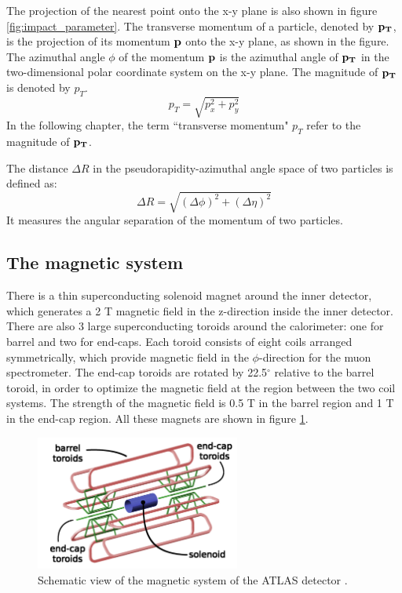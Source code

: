 The projection of the nearest point onto the x-y plane is also shown in figure \ref{fig:impact_parameter}.
The transverse momentum of a particle, denoted by $\bf{p}_T$, is the projection of its momentum $\bf{p}$ onto the x-y plane, as shown in the figure.
The azimuthal angle $\phi$ of the momentum $\bf{p}$ is the azimuthal angle of $\bf{p}_T$ in the two-dimensional polar coordinate system on the x-y plane.
The magnitude of $\bf{p}_T$ is denoted by $p_T$.
\begin{equation}
p_T = \sqrt{p_x^2 + p_y^2}
\end{equation}
In the following chapter, the term ``transverse momentum" $p_T$ refer to the magnitude of $\bf{p}_T$.

The distance $\Delta R$ in the pseudorapidity-azimuthal angle space of two particles is defined as:
\begin{equation}
\Delta R = \sqrt{(\Delta \phi) ^2 + (\Delta \eta) ^2}
\end{equation}
It measures the angular separation of the momentum of two particles.

\subsection{The magnetic system}
\label{sec:magnetic_system}
There is a thin superconducting solenoid magnet around the inner detector, which generates a 2 T magnetic field in the z-direction inside the inner detector.
There are also 3 large superconducting toroids around the calorimeter: one for barrel and two for end-caps.
Each toroid consists of eight coils arranged symmetrically, which provide magnetic field in the $\phi$-direction for the muon spectrometer.
The end-cap toroids are rotated by 22.5$^{\circ}$ relative to the barrel toroid, in order to optimize the magnetic field at the region between the two coil systems.
The strength of the magnetic field is 0.5 T in the barrel region and 1 T in the end-cap region.
All these magnets are shown in figure \ref{fig:magnetic_system}.

\begin{figure}
\centering
\includegraphics[width=0.6\textwidth]{data/photo/detector/magnet.png}
\caption{Schematic view of the magnetic system of the ATLAS detector \cite{magnetic_system}.}
\label{fig:magnetic_system}
\end{figure}

